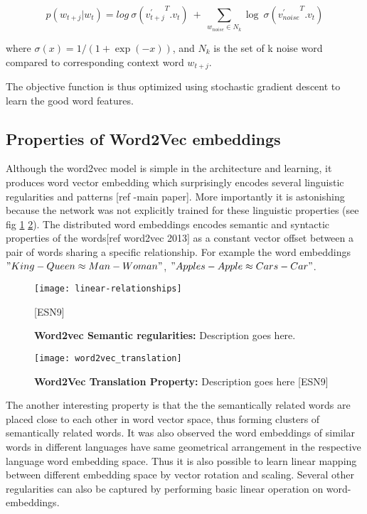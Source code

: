 \begin{equation}
p(w_{t+j}|w_t)=log\ \sigma({{v^{'}_{t+j}}^{T}}.{v_t})\ +\  \sum_{w_{noise}{\in}N_{k}} \log\ \sigma({{v^{'}_{noise}}^T}.v_{t})
\end{equation}

where $\sigma(x)=1/(1+\exp(-x))$, and $N_k$ is the set of k noise word compared to corresponding context word $w_{t+j}$.

The objective function is thus optimized using stochastic gradient descent to learn the good word features.

\subsection{Properties of Word2Vec embeddings}

Although the word2vec model is simple in the architecture and learning, it produces word vector embedding which surprisingly encodes several linguistic regularities and patterns [ref -main paper]. More importantly it is astonishing because the network was not explicitly trained for these linguistic properties (see fig \ref{fig:sem_rel} \ref{fig:w2v_translation}). The distributed word embeddings encodes semantic and syntactic properties of the words[ref word2vec 2013] as a constant vector offset between a pair of words sharing a specific relationship. For example the word embeddings $"King - Queen \approx Man - Woman"$, $"Apples - Apple \approx Cars - Car"$.

\begin{figure}[hbtp]
\centering
\texttt{[image: linear-relationships]}
\caption{\textbf{Word2vec Semantic regularities:} Description goes here.}[ESN9]
\label{fig:sem_rel}
\end{figure}

\begin{figure}[hbtp]
\centering
\texttt{[image: word2vec\_translation]}
\caption{\textbf{Word2Vec Translation Property:} Description goes here [ESN9]}
\label{fig:w2v_translation}
\end{figure}

The another interesting property is that the the semantically related words are placed close to each other in word vector space, thus forming clusters of semantically related words. It was also observed the word embeddings of similar words in different languages have same geometrical arrangement in the respective language word embedding space. Thus it is also possible to learn linear mapping between different embedding space by vector rotation and scaling. Several other regularities can also be captured by performing basic linear operation on word-embeddings. 

